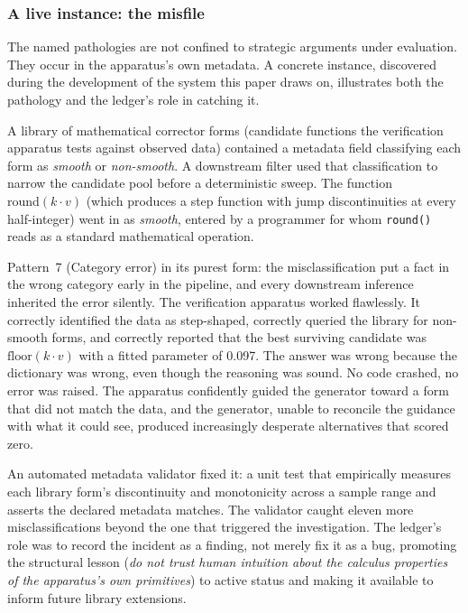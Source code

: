 \documentclass[
  11pt,
]{article}
\begin{document}
\subsubsection{A live instance: the
misfile}\label{a-live-instance-the-misfile}

The named pathologies are not confined to strategic arguments under
evaluation. They occur in the apparatus's own metadata. A concrete
instance, discovered during the development of the system this paper draws
on, illustrates both the pathology and the ledger's role in catching it.

A library of mathematical corrector forms (candidate functions the
verification apparatus tests against observed data) contained a metadata
field classifying each form as \emph{smooth} or \emph{non-smooth}. A
downstream filter used that classification to narrow the candidate
pool before a deterministic sweep. The function
\(\text{round}(k \cdot v)\) (which produces a step function with jump
discontinuities at every half-integer) went in as \emph{smooth}, entered by a
programmer for whom \texttt{round()} reads as a standard
mathematical operation.

Pattern~7 (Category error) in its purest form: the misclassification put a
fact in the wrong category early in the pipeline, and every
downstream inference inherited the error silently. The verification
apparatus worked flawlessly. It correctly identified the data as
step-shaped, correctly queried the library for non-smooth forms, and
correctly reported that the best surviving candidate was
\(\text{floor}(k \cdot v)\) with a fitted parameter of 0.097. The answer
was wrong because the dictionary was wrong, even though the reasoning was sound. No code crashed, no error was raised. The apparatus confidently
guided the generator toward a form that did not match the
data, and the generator, unable to reconcile the guidance with what it
could see, produced increasingly desperate alternatives that scored
zero.

An automated metadata validator fixed it: a unit test that empirically
measures each library form's discontinuity and monotonicity across a
sample range and asserts the declared metadata matches. The
validator caught eleven more misclassifications beyond the one
that triggered the investigation. The ledger's role was to record the
incident as a finding, not merely fix it as a bug, promoting the
structural lesson (\emph{do not trust human intuition about the calculus
properties of the apparatus's own primitives}) to active status
and making it available to inform future library extensions.
\end{document}
